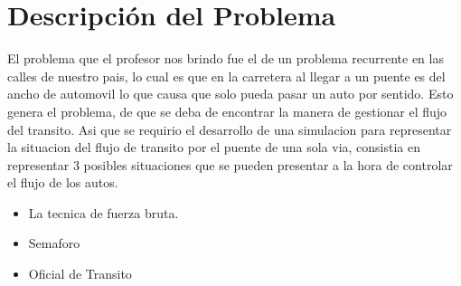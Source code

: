 \documentclass[10pt,a4paper]{article}
\begin{document}
\section{Descripción del Problema}
El problema que el profesor nos brindo fue el de un problema recurrente en las calles de nuestro pais, lo cual es que en la carretera al llegar a un puente es del ancho de automovil lo que causa que solo pueda pasar un auto por sentido. 
Esto genera el problema, de que se deba de encontrar la manera de gestionar el flujo del transito. 
Asi que se requirio el desarrollo de una simulacion para representar la situacion del flujo de transito por el puente de una sola via, consistia en representar 3 posibles situaciones que se pueden presentar a la hora de controlar el flujo de los autos. 
\begin{itemize}
\item La tecnica de fuerza bruta.
\item Semaforo
\item Oficial de Transito 
\end{itemize}
\end{document}

